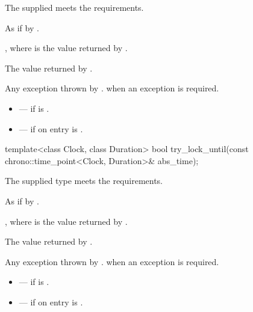 \begin{itemdescr}
\pnum
\expects
The supplied  meets the 
requirements.

\pnum
\effects
As if by .

\pnum
\ensures
{}, where  is the value returned by
.

\pnum
\returns
The value returned by .

\pnum
\throws
Any exception thrown by .  when an exception
is required.

\pnum
\errors
\begin{itemize}
\item {} --- if  is .
\item {} --- if on entry 
is .
\end{itemize}
\end{itemdescr}

%
\begin{itemdecl}
template<class Clock, class Duration>
  bool try_lock_until(const chrono::time_point<Clock, Duration>& abs_time);
\end{itemdecl}

\begin{itemdescr}
\pnum
\expects
The supplied  type meets the 
requirements.

\pnum
\effects
As if by .

\pnum
\ensures
{}, where  is the value returned by
.

\pnum
\returns
The value returned by .

\pnum
\throws
Any exception thrown by .  when an
exception is required.

\pnum
\errors
\begin{itemize}
\item {} --- if  is .
\item {} --- if on entry  is
.
\end{itemize}
\end{itemdescr}

